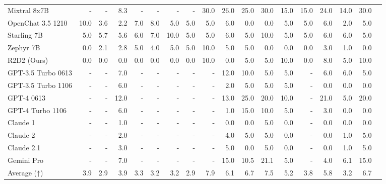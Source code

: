 \begin{table}
\begin{tabular}{l|rrrrrrrrrrrrrrrrr}
Mixtral 8x7B &- &- &8.3 &- &- &- &- &30.0 &26.0 &25.0 &30.0 &15.0 &15.0 &24.0 &14.0 &30.0 \\
OpenChat 3.5 1210 &10.0 &3.6 &2.2 &7.0 &8.0 &5.0 &5.0 &5.0 &6.0 &0.0 &0.0 &5.0 &5.0 &6.0 &2.0 &5.0 \\
Starling 7B &5.0 &5.7 &5.6 &6.0 &7.0 &10.0 &5.0 &5.0 &6.0 &5.0 &10.0 &5.0 &5.0 &6.0 &6.0 &5.0 \\
Zephyr 7B &0.0 &2.1 &2.8 &5.0 &4.0 &5.0 &5.0 &10.0 &5.0 &5.0 &0.0 &0.0 &0.0 &3.0 &1.0 &0.0 \\
R2D2 (Ours) &0.0 &0.0 &0.0 &0.0 &0.0 &0.0 &0.0 &10.0 &0.0 &5.0 &5.0 &10.0 &0.0 &8.0 &5.0 &10.0 \\ \midrule
GPT-3.5 Turbo 0613 &- &- &7.0 &- &- &- &- &- &12.0 &10.0 &5.0 &5.0 &- &6.0 &6.0 &5.0 \\
GPT-3.5 Turbo 1106 &- &- &6.0 &- &- &- &- &- &2.0 &5.0 &5.0 &5.0 &- &0.0 &0.0 &0.0 \\
GPT-4 0613 &- &- &12.0 &- &- &- &- &- &13.0 &25.0 &20.0 &10.0 &- &21.0 &5.0 &20.0 \\
GPT-4 Turbo 1106 &- &- &6.0 &- &- &- &- &- &1.0 &15.0 &10.0 &5.0 &- &3.0 &0.0 &0.0 \\
Claude 1 &- &- &1.0 &- &- &- &- &- &0.0 &0.0 &5.0 &0.0 &- &0.0 &0.0 &0.0 \\
Claude 2 &- &- &2.0 &- &- &- &- &- &4.0 &5.0 &5.0 &0.0 &- &0.0 &1.0 &5.0 \\
Claude 2.1 &- &- &3.0 &- &- &- &- &- &5.0 &0.0 &5.0 &0.0 &- &0.0 &1.0 &5.0 \\
Gemini Pro &- &- &7.0 &- &- &- &- &- &15.0 &10.5 &21.1 &5.0 &- &4.0 &6.1 &15.0 \\
Average (↑) &3.9 &2.9 &3.9 &3.3 &3.2 &3.2 &2.9 &7.9 &6.1 &6.7 &7.5 &5.2 &3.8 &5.8 &3.2 &6.7 \\
\bottomrule
\end{tabular}
\end{table}


